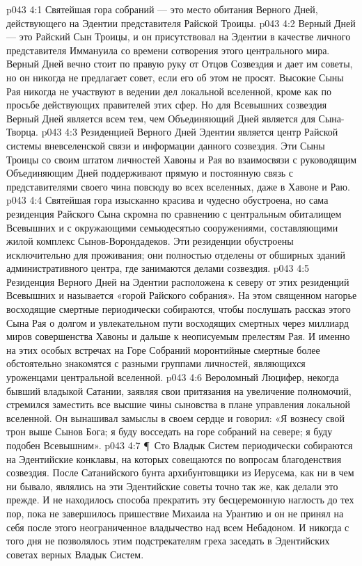 \vs p043 4:1 Святейшая гора собраний --- это место обитания Верного Дней, действующего на Эдентии представителя Райской Троицы.
\vs p043 4:2 Верный Дней --- это Райский Сын Троицы, и он присутствовал на Эдентии в качестве личного представителя Иммануила со времени сотворения этого центрального мира. Верный Дней вечно стоит по правую руку от Отцов Созвездия и дает им советы, но он никогда не предлагает совет, если его об этом не просят. Высокие Сыны Рая никогда не участвуют в ведении дел локальной вселенной, кроме как по просьбе действующих правителей этих сфер. Но для Всевышних созвездия Верный Дней является всем тем, чем Объединяющий Дней является для Сына\hyp{}Творца.
\vs p043 4:3 Резиденцией Верного Дней Эдентии является центр Райской системы вневселенской связи и информации данного созвездия. Эти Сыны Троицы со своим штатом личностей Хавоны и Рая во взаимосвязи с руководящим Объединяющим Дней поддерживают прямую и постоянную связь с представителями своего чина повсюду во всех вселенных, даже в Хавоне и Раю.
\vs p043 4:4 Святейшая гора изысканно красива и чудесно обустроена, но сама резиденция Райского Сына скромна по сравнению с центральным обиталищем Всевышних и с окружающими семьюдесятью сооружениями, составляющими жилой комплекс Сынов\hyp{}Ворондадеков. Эти резиденции обустроены исключительно для проживания; они полностью отделены от обширных зданий административного центра, где занимаются делами созвездия.
\vs p043 4:5 Резиденция Верного Дней на Эдентии расположена к северу от этих резиденций Всевышних и называется «горой Райского собрания». На этом священном нагорье восходящие смертные периодически собираются, чтобы послушать рассказ этого Сына Рая о долгом и увлекательном пути восходящих смертных через миллиард миров совершенства Хавоны и дальше к неописуемым прелестям Рая. И именно на этих особых встречах на Горе Собраний моронтийные смертные более обстоятельно знакомятся с разными группами личностей, являющихся уроженцами центральной вселенной.
\vs p043 4:6 Вероломный Люцифер, некогда бывший владыкой Сатании, заявляя свои притязания на увеличение полномочий, стремился заместить все высшие чины сыновства в плане управления локальной вселенной. Он вынашивал замыслы в своем сердце и говорил: «Я вознесу свой трон выше Сынов Бога; я буду восседать на горе собраний на севере; я буду подобен Всевышним».
\vs p043 4:7 \P\ Сто Владык Систем периодически собираются на Эдентийские конклавы, на которых совещаются по вопросам благоденствия созвездия. После Сатанийского бунта архибунтовщики из Иерусема, как ни в чем ни бывало, являлись на эти Эдентийские советы точно так же, как делали это прежде. И не находилось способа прекратить эту бесцеремонную наглость до тех пор, пока не завершилось пришествие Михаила на Урантию и он не принял на себя после этого неограниченное владычество над всем Небадоном. И никогда с того дня не позволялось этим подстрекателям греха заседать в Эдентийских советах верных Владык Систем.
